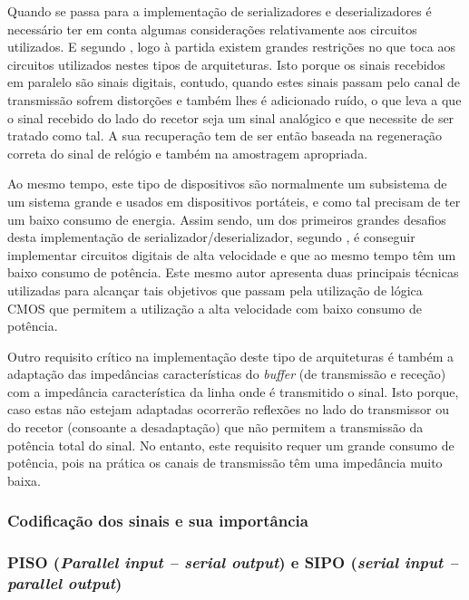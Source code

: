 Quando se passa para a implementação de serializadores e deserializadores é necessário ter em conta algumas considerações relativamente aos circuitos utilizados. E segundo \cite{R012}, logo à partida existem grandes restrições no que toca aos circuitos utilizados nestes tipos de arquiteturas. Isto porque os sinais recebidos em paralelo são sinais digitais, contudo, quando estes sinais passam pelo canal de transmissão sofrem distorções e também lhes é adicionado ruído, o que leva a que o sinal recebido do lado do recetor seja um sinal analógico e que necessite de ser tratado como tal. A sua recuperação tem de ser então baseada na regeneração correta do sinal de relógio e também na amostragem apropriada. 
	
Ao mesmo tempo, este tipo de dispositivos são normalmente um subsistema de um sistema grande e usados em dispositivos portáteis, e como tal precisam de ter um baixo consumo de energia. Assim sendo, um dos primeiros grandes desafios desta implementação de serializador/deserializador, segundo \cite{R012}, é conseguir implementar circuitos digitais de alta velocidade e que ao mesmo tempo têm um baixo consumo de potência. Este mesmo autor apresenta duas principais técnicas utilizadas para alcançar tais objetivos que passam pela utilização de lógica CMOS que permitem a utilização a alta velocidade com baixo consumo de potência. 
	
Outro requisito crítico na implementação deste tipo de arquiteturas é também a adaptação das impedâncias características do \textit{buffer} (de transmissão e receção) com a impedância característica da linha onde é transmitido o sinal. Isto porque, caso estas não estejam adaptadas ocorrerão reflexões no lado do transmissor ou do recetor (consoante a desadaptação) que não permitem a transmissão da potência total do sinal. No entanto, este requisito requer um grande consumo de potência, pois na prática os canais de transmissão têm uma impedância muito baixa. 

\subsubsection*{Codificação dos sinais e sua importância}

\subsubsection*{PISO (\textit{Parallel input – serial output}) e SIPO (\textit{serial input – parallel output})}

